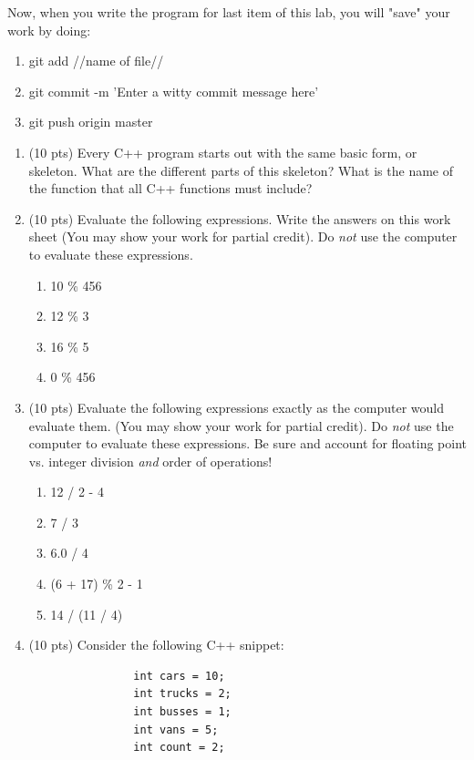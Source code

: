\documentclass[letterpaper,12pt]{article}
\begin{document}
Now, when you write the program for last item of this lab, you will "save" your work by doing:
\begin{enumerate}
    \item git add //name of file//
    \item git commit -m 'Enter a witty commit message here'
    \item git push origin master
\end{enumerate}

\begin{enumerate}
    \item(10 pts) Every C++ program starts out with the same basic form, or skeleton.
         What are the different parts of this skeleton?
         What is the name of the function that all C++ functions must include?
    \vspace{40mm}
    \item(10 pts) Evaluate the following expressions.
         Write the answers on this work sheet (You may show your work for partial credit).
         Do \emph{not} use the computer to evaluate these expressions.
         \begin{enumerate}
             \item 10 \% 456
             \item 12 \% 3
             \item 16 \% 5
             \item 0 \% 456
         \end{enumerate}
    \item (10 pts) Evaluate the following expressions exactly as the computer would evaluate them.
          (You may show your work for partial credit). Do \emph{not} use the computer to evaluate
          these expressions. Be sure and account for floating point vs. integer division \emph{and}
          order of operations!
            \begin{enumerate}
                \item 12 / 2 - 4
                \item 7 / 3
                \item 6.0 / 4
                \item (6 + 17) \% 2 - 1
                \item 14 / (11 / 4)
            \end{enumerate}
    \item (10 pts) Consider the following C++ snippet:
            \begin{lstlisting}
                int cars = 10;
                int trucks = 2;
                int busses = 1;
                int vans = 5;
                int count = 2;


\end{lstlisting}
\end{enumerate}
\end{document}
